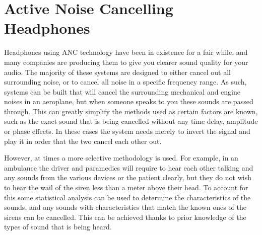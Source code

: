 \section{Active Noise Cancelling Headphones}
Headphones using ANC technology have been in existence for a fair while, and many companies are producing them to give you clearer sound quality for your audio.
The majority of these systems are designed to either cancel out all surrounding noise, or to cancel all noise in a specific frequency range.
As such, systems can be built that will cancel the surrounding mechanical and engine noises in an aeroplane, but when someone speaks to you these sounds are passed through.
This can greatly simplify the methods used as certain factors are known, such as the exact sound that is being cancelled without any time delay, amplitude or phase effects.
In these cases the system needs merely to invert the signal and play it in order that the two cancel each other out\cite{EMNoiseCancel}.

However, at times a more selective methodology is used. For example, in an ambulance the driver and paramedics will require to hear each other talking and any sounds from the various devices or the patient clearly, but they do not wish to hear the wail of the siren less than a meter above their head\cite{EMHeadsets}.
To account for this some statistical analysis can be used to determine the characteristics of the sounds, and any sounds with characteristics that match the known ones of the sirens can be cancelled.
This can be achieved thanks to prior knowledge of the types of sound that is being heard.
